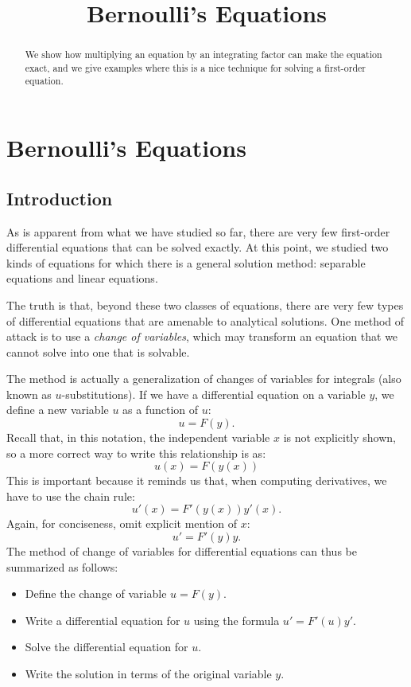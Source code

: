 \documentclass{ximera}
\title{Bernoulli's Equations}
\begin{document}
\begin{abstract}
We show how multiplying an equation by an integrating factor can make the equation exact, and we give examples where this is a nice technique for solving a first-order equation.
\end{abstract}

\maketitle

\section*{Bernoulli's Equations}

\subsection*{Introduction}
As is apparent from what we have studied so far, there are very few first-order differential equations that can be solved exactly. At this point, we studied two kinds of equations for which there is a general solution method: separable equations and linear equations.

The truth is that, beyond these two classes of equations, there are very few types of differential equations that are amenable to analytical solutions. One method of attack is to use a \textit{change of variables}, which may transform an equation that we cannot solve into one that is solvable.

The method is actually a generalization of changes of variables for integrals (also known as $u$-substitutions). If we have a differential equation on a variable $y$, we define a new variable $u$ as a function of $u$:
\[
u=F(y).
\]
Recall that, in this notation, the independent variable $x$ is not explicitly shown, so a more correct way to write this relationship is as:
\[
u(x)=F(y(x))
\]
This is important because it reminds us that, when computing derivatives, we have to use the chain rule:
\[
u'(x)=F'(y(x))y'(x).
\]
Again, for conciseness, omit explicit mention of $x$:
\[
u'=F'(y)y.
\]
The method of change of variables for differential equations can thus be summarized as follows:

\begin{itemize}
\item Define the change of variable $u=F(y)$.
\item Write a differential equation for $u$ using the formula $u'=F'(u)y'$.
\item Solve the differential equation for $u$.
\item Write the solution in terms of the original variable $y$.
\end{itemize}
\end{document}
